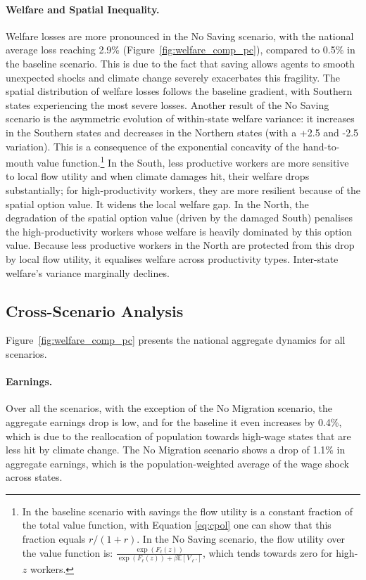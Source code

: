 \documentclass[12pt, a4paper]{article}
\begin{document}
\paragraph{Welfare and Spatial Inequality.} Welfare losses are more pronounced in the No Saving scenario, with the national average loss reaching 2.9\% (Figure~\ref{fig:welfare_comp_pc}), compared to 0.5\% in the baseline scenario. This is due to the fact that saving allows agents to smooth unexpected shocks and climate change severely exacerbates this fragility. The spatial distribution of welfare losses follows the baseline gradient, with Southern states experiencing the most severe losses. Another result of the No Saving scenario is the asymmetric evolution of within-state welfare variance: it increases in the Southern states and decreases in the Northern states (with a +2.5 and -2.5 variation). This is a consequence of the exponential concavity of the hand-to-mouth value function.\footnote{In the baseline scenario with savings the flow utility is a constant fraction of the total value function, with Equation \ref{eq:cpol} one can show that this fraction equals $r/(1+r)$. In the No Saving scenario, the flow utility over the value function is: $ \frac{\exp(F_\ell(z))}{\exp(F_\ell(z)) + \beta \mathbb{E}[V_{\ell'}]}$, which tends towards zero for high-$z$ workers.} In the South, less productive workers are more sensitive to local flow utility and when climate damages hit, their welfare drops substantially; for high-productivity workers, they are more resilient because of the spatial option value. It widens the local welfare gap. In the North, the degradation of the spatial option value (driven by the damaged South) penalises the high-productivity workers whose welfare is heavily dominated by this option value. Because less productive workers in the North are protected from this drop by local flow utility, it equalises welfare across productivity types. Inter-state welfare's variance marginally declines.


\subsection{Cross-Scenario Analysis}
\label{sec:audit}
Figure~\ref{fig:welfare_comp_pc} presents the national aggregate dynamics for all scenarios. 
\paragraph{Earnings.}
Over all the scenarios, with the exception of the No Migration scenario, the aggregate earnings drop is low, and for the baseline it even increases by 0.4\%, which is due to the reallocation of population towards high-wage states that are less hit by climate change. The No Migration scenario shows a drop of 1.1\% in aggregate earnings, which is the population-weighted average of the wage shock across states. 

\end{document}
